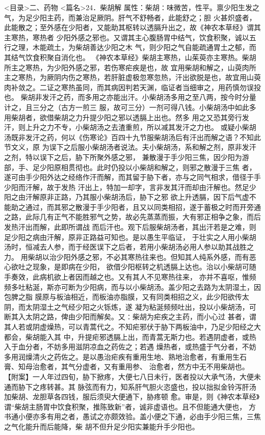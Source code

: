 \documentclass[a4paper,12pt,UTF8,twoside]{ctexbook}
\begin{document}
<目录>二、药物
<篇名>24．柴胡解
属性：柴胡∶味微苦，性平。禀少阳生发之气，为足少阳主药，而兼治足厥阴。肝气不舒畅者，此能舒之；胆 
火甚炽盛者，此能散之；至外感在少阳者，又能助其枢转以透膈升出之，故《神农本草经》谓其主寒热，寒热者 
少阳外感之邪也。又谓其主心腹肠胃中结气，饮食积聚，诚以五行之理，木能疏土，为柴胡善达少阳之木 
气，则少阳之气自能疏通胃土之郁，而其结气饮食积聚自消化也。 
《神农本草经》柴胡主寒热，山茱萸亦主寒热。柴胡所主之寒热，为少阳外感之邪，若伤寒疟疾是也，故 
宜用柴胡和解之，山萸肉所主之寒热，为厥阴内伤之寒热，若肝脏虚极忽寒忽热，汗出欲脱是也，故宜用山萸 
肉补敛之。二证之寒热虽同，而其病因判若天渊，临证者当细审之，用药慎勿误投也。 
柴胡非发汗之药，而多用之亦能出汗。小柴胡汤多用之至八两，按今时分量计之，且三分之（古方一煎三 
服，故可三分）一剂可得八钱。小柴胡汤中如此多用柴胡者，欲借柴胡之力升提少阳之邪以透膈上出也。然多 
用之又恐其旁行发汗，则上升之力不专，小柴胡汤之去渣重煎，所以减其发汗之力也。 
或疑小柴胡汤既非发汗之药，何以《伤寒论》百四十九节服柴胡汤后有汗出而解之语？不知此节文义，原 
为误下之后服小柴胡汤者说法。夫小柴胡汤，系和解之剂，原非发汗之剂，特以误下之后，胁下所聚外感之邪， 
兼散漫于手少阳三焦，因少阳为游部，手、足少阳原相贯彻也。此时仍投以小柴胡和解之，则邪之散漫于三焦 
者，遂可由手少阳外达之经络作汗而解，而其留于胁下者，亦与之同气相求，借径于手少阳而汗解，故于发热 
汗出上，特加一却字，言非发其汗而却由汗解也。然足少阳之由汗解原非正路，乃其服小柴胡汤后，胁下之邪 
欲上升透膈，因下后气虚不能助之通过，而其邪之散漫于手少阳者，且又以同类相招，遂于蓄极之时而开旁通 
之路，此际几有正气不能胜邪气之势，故必先蒸蒸而振，大有邪正相争之象，而后发热汗出而解，此即所谓战 
而后汗也。观下后服柴胡汤者，其出汗若是之难，则足少阳之病由汗解，原非正路益可知也。是以愚生平临证， 
于壮实之人用小柴胡汤时，恒减去人参，而于经医误下之后者，若用小柴胡汤必用人参以助其战胜之力。 
用柴胡以治少阳外感之邪，不必其寒热往来也。但知其人纯系外感，而有恶心欲吐之现象，是即病在少阳， 
欲借少阳枢转之机透膈上达也。治以小柴胡可随手奏效，此病机欲上者因而越之也。又有其人不见寒热往来， 
亦并不喜呕，惟频频多吐粘涎，斯亦可断为少阳病，而与以小柴胡汤。盖少阳之去路为太阴湿土，因包脾之脂 
膜原与板油相近，而板油亦脂膜，又有同类相招之义，此少阳欲传太阴，而太阴湿土之气经少阳之火铄炼，遂 
凝为粘涎频频吐出，投以小柴胡汤，可断其入太阴之路，俾由少阳而解矣。又∶柴胡为疟疾之主药，而小心过 
甚者，谓其人若或阴虚燥热，可以青蒿代之。不知疟邪伏于胁下两板油中，乃足少阳经之大都会，柴胡能入其 
中，升提疟邪透膈上出，而青蒿无斯力也。若遇阴虚者，或热入于血分者，不妨多用滋阴凉血之药佐之；若遇 
燥热者，或热盛于气分者，不妨多用润燥清火之药佐之。是以愚治疟疾有重用生地、熟地治愈者，有重用生石 
膏、知母治愈者，其气分虚者，又有重用参、 治愈者，然方中无不用柴胡也。 
【附案】一人年过四旬，胁下掀疼，大便七八日未行，医者投以大承气汤，大便未通而胁下之疼转甚。其 
脉弦而有力，知系肝气胆火恣盛也，投以拙拟金铃泻肝汤加柴胡、龙胆草各四钱，服后须臾大便通下，胁疼顿 
愈。审是，则《神农本草经》谓“柴胡主肠胃中饮食积聚，推陈致新”者，诚非虚语也。且不但能通大便也， 
方书通小便亦多有用之者，愚试之亦颇效验。盖小便之下通，必由手少阳三焦，三焦之气化能升而后能降，柴 
胡不但升足少阳实兼能升手少阳也。 
\end{document}
